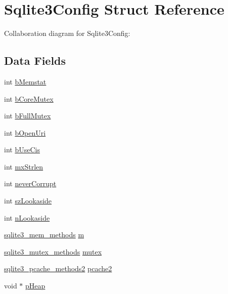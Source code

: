 \hypertarget{struct_sqlite3_config}{}\section{Sqlite3\+Config Struct Reference}
\label{struct_sqlite3_config}


Collaboration diagram for Sqlite3\+Config\+:
\subsection*{Data Fields}
\begin{DoxyCompactItemize}
\item 
int \hyperlink{struct_sqlite3_config_a8dfc655e09e968f581673d82fce0769a}{b\+Memstat}
\item 
int \hyperlink{struct_sqlite3_config_a9b19cb17e4c7a75ebc366513f84ae3bb}{b\+Core\+Mutex}
\item 
int \hyperlink{struct_sqlite3_config_a13bc99b79aa8349932f788be7415077c}{b\+Full\+Mutex}
\item 
int \hyperlink{struct_sqlite3_config_ad7b7a342d22db7302e7c2891d9ada29c}{b\+Open\+Uri}
\item 
int \hyperlink{struct_sqlite3_config_a7491b8e0d85db8c5aa3c412487a4f31d}{b\+Use\+Cis}
\item 
int \hyperlink{struct_sqlite3_config_a0faee16932dbed888694e892b8230c6d}{mx\+Strlen}
\item 
int \hyperlink{struct_sqlite3_config_a05b2ce44944a6e771f6c75bb32db984b}{never\+Corrupt}
\item 
int \hyperlink{struct_sqlite3_config_a60ef70cefa59c42de0133555420243a0}{sz\+Lookaside}
\item 
int \hyperlink{struct_sqlite3_config_af7546c4257d5b6d4ebcea412f3329067}{n\+Lookaside}
\item 
\hyperlink{structsqlite3__mem__methods}{sqlite3\+\_\+mem\+\_\+methods} \hyperlink{struct_sqlite3_config_a1330f8bd731e42003426946f2e7df47f}{m}
\item 
\hyperlink{structsqlite3__mutex__methods}{sqlite3\+\_\+mutex\+\_\+methods} \hyperlink{struct_sqlite3_config_a7139046a63b0fa38ee9d2dfa0ced3019}{mutex}
\item 
\hyperlink{structsqlite3__pcache__methods2}{sqlite3\+\_\+pcache\+\_\+methods2} \hyperlink{struct_sqlite3_config_a78ebacd69f832305f42dec645ba48a2c}{pcache2}
\item 
void $\ast$ \hyperlink{struct_sqlite3_config_a5d36d9050528de8c61e7be52131215e6}{p\+Heap}
\item 

\end{DoxyCompactItemize}
